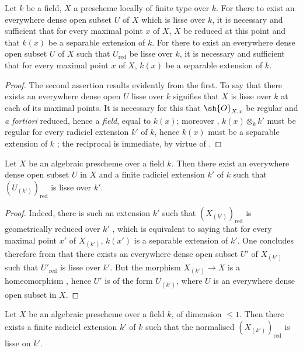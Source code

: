 \begin{proposition}[17.15.12]
\label{IV.17.15.12}
Let $k$ be a field, $X$ a prescheme locally of finite type over $k$.
For there to exist an everywhere dense open subset $U$ of $X$ which is lisse over $k$, it is necessary and sufficient that for every maximal point $x$ of $X$, $X$ be reduced at this point and that $k(x)$ be a separable extension of $k$.
For there to exist an everywhere dense open subset $U$ of $X$ such that $U_{\mathrm{red}}$ be lisse over $k$, it is necessary and sufficient that for every maximal point $x$ of $X$, $k(x)$ be a separable extension of $k$.
\end{proposition}

\begin{proof}
The second assertion results evidently from the first.
To say that there exists an everywhere dense open $U$ lisse over $k$ signifies that $X$ is lisse over $k$ at each of its maximal points.
It is necessary for this that $\sh{O}_{X,x}$ be regular  and \emph{a fortiori} reduced, hence a \emph{field}, equal to $k(x)$; moreover , $k(x)\otimes_k k'$ must be regular for every radiciel extension $k'$ of $k$, hence $k(x)$ must be a separable extension of $k$ ; the reciprocal is immediate, by virtue of .
\end{proof}

\begin{corollary}[17.15.13]
\label{IV.17.15.13}
Let $X$ be an algebraic prescheme over a field $k$.
Then there exist an everywhere dense open subset $U$ in $X$ and a finite radiciel extension $k'$ of $k$ such that $(U_{(k')})_{\mathrm{red}}$ is lisse over $k'$.
\end{corollary}

\begin{proof}
Indeed, there is such an extension $k'$ such that $(X_{(k')})_{\mathrm{red}}$ is geometrically reduced over $k'$ , which is equivalent to saying  that for every maximal point $x'$ of $X_{(k')}$, $k(x')$ is a separable extension of $k'$.
One concludes therefore from  that there exists an everywhere dense open subset $U'$ of $X_{(k')}$ such that $U'_{\mathrm{red}}$ is lisse over $k'$.
But the morphism $X_{(k')}\to X$ is a homeomorphism , hence $U'$ is of the form $U_{(k')}$, where $U$ is an everywhere dense open subset in $X$.
\end{proof}

\begin{proposition}[17.15.14]
\label{IV.17.15.14}
Let $X$ be an algebraic prescheme over a field $k$, of dimension $\leq 1$.
Then there exists a finite radiciel extension $k'$ of $k$ such that the normalised $(X_{(k')})_{\mathrm{red}}$ is lisse on $k'$.
\end{proposition}

